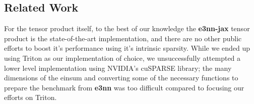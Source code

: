 \subsection{Related Work}
For the tensor product itself, to the best of our knowledge the \textbf{e3nn-jax} tensor product is the state-of-the-art implementation, and 
there are no other public efforts to boost it's performance using it's intrinsic sparsity. While we ended up using Triton as our implementation 
of choice, we unsuccessfully attempted a lower level implementation using NVIDIA's cuSPARSE library\cite{nvidia_cusparse}; the many dimensions of the einsum and converting 
some of the necessary functions to prepare the benchmark from \textbf{e3nn} was too difficult compared to focusing our efforts on Triton.




    